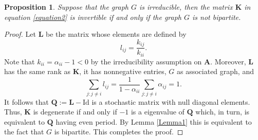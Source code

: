 \documentclass[article,12pt]{article}
\theoremstyle{plain}
\newtheorem{proposition}[theorem]{Proposition}
\theoremstyle{definition}
\theoremstyle{remark}
\numberwithin{equation}{section}
\numberwithin{theorem}{section}
\newcommand{\Id}{\boldsymbol{\mathrm{Id}}}
\begin{document}
		\begin{proposition}\label{matrixK}
			Suppose that the graph $G$ is irreducible, then the matrix $\mathbf{K}$ in equation \eqref{equation2} is invertible if and only if the graph $G$ is not bipartite. 
		\end{proposition}
		\begin{proof}
			Let $\mathbf{L}$ be the matrix whose elements are defined by
			\[
			l_{ij} =  \frac{k_{ij}}{k_{ii}}.
			\]
			Note that $k_{ii} = \alpha_{ii} - 1 <0$ by the irreducibility assumption on $\mathbf{A}$. Moreover, $\mathbf{L}$ has the same rank as $\mathbf{K}$, it has nonnegative entries, $G$ as associated graph, and
			\[
			\sum_{j:j \neq i} l_{ij} = \frac{1}{1-\alpha_{ii}} \sum_{j:j \neq i} \alpha_{ij} = 1.
			\]
			It follows that $\mathbf{Q} := \mathbf{L} - \Id$ is a stochastic matrix with null diagonal elements. Thus, $\mathbf{K}$ is degenerate if and only if $-1$ is a eigenvalue of $\mathbf{Q}$ which, in turn, is equivalent to $\mathbf{Q}$ having even period. By Lemma \ref{Lemma1} this is equivalent to the fact that $G$ is bipartite. This completes the proof.
		\end{proof}
		
\end{document}
